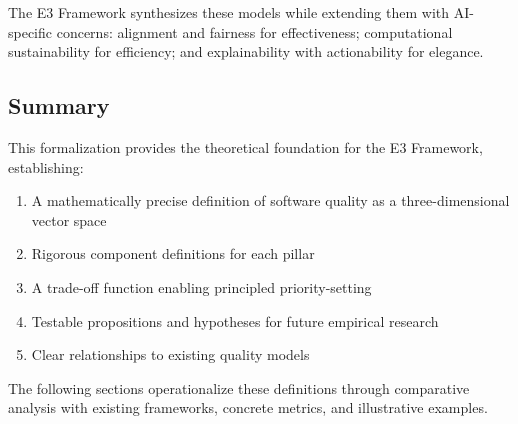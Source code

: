 The E3 Framework synthesizes these models while extending them with AI-specific concerns: alignment and fairness for effectiveness; computational sustainability for efficiency; and explainability with actionability for elegance.

\subsection{Summary}

This formalization provides the theoretical foundation for the E3 Framework, establishing:
\begin{enumerate}[leftmargin=2em]
    \item A mathematically precise definition of software quality as a three-dimensional vector space
    \item Rigorous component definitions for each pillar
    \item A trade-off function enabling principled priority-setting
    \item Testable propositions and hypotheses for future empirical research
    \item Clear relationships to existing quality models
\end{enumerate}

The following sections operationalize these definitions through comparative analysis with existing frameworks, concrete metrics, and illustrative examples.